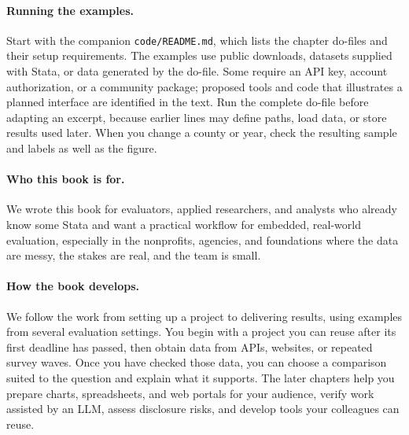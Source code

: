 \documentclass[
    a4paper,
    fontsize=10pt,
    twoside=true,
    numbers=noenddot,
]{kaobook}
\begin{document}
\paragraph{Running the examples.} Start with the companion \texttt{code/README.md}, which lists the chapter do-files and their setup requirements. The examples use public downloads, datasets supplied with Stata, or data generated by the do-file. Some require an API key, account authorization, or a community package; proposed tools and code that illustrates a planned interface are identified in the text. Run the complete do-file before adapting an excerpt, because earlier lines may define paths, load data, or store results used later. When you change a county or year, check the resulting sample and labels as well as the figure.

\paragraph{Who this book is for.} We wrote this book for evaluators, applied researchers, and analysts who already know some Stata and want a practical workflow for embedded, real-world evaluation, especially in the nonprofits, agencies, and foundations where the data are messy, the stakes are real, and the team is small.

\paragraph{How the book develops.} We follow the work from setting up a project to delivering results, using examples from several evaluation settings. You begin with a project you can reuse after its first deadline has passed, then obtain data from APIs, websites, or repeated survey waves. Once you have checked those data, you can choose a comparison suited to the question and explain what it supports. The later chapters help you prepare charts, spreadsheets, and web portals for your audience, verify work assisted by an LLM, assess disclosure risks, and develop tools your colleagues can reuse.
\end{document}

